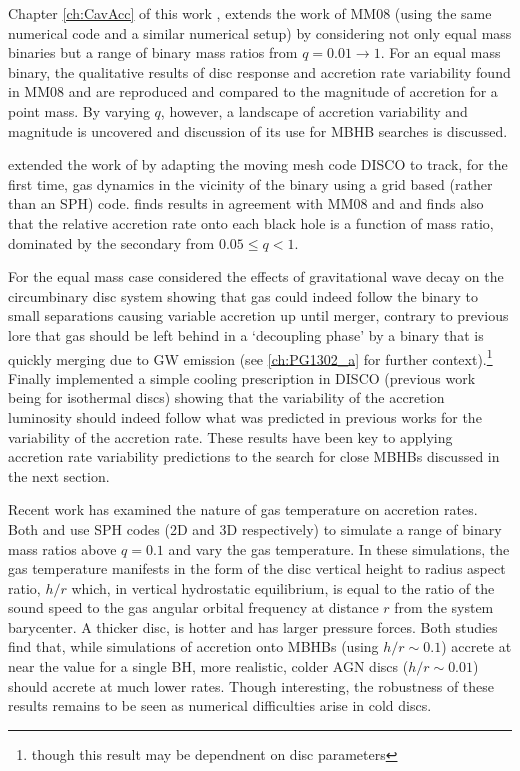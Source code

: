 Chapter \ref{ch:CavAcc} of this work \citep{DHM:2013:MNRAS}, extends the work
of MM08 (using the same numerical code and a similar numerical setup) by
considering not only equal mass binaries but a range of binary mass ratios
from $q=0.01 \rightarrow 1$. For an equal mass binary, the qualitative results
of disc response and accretion rate variability found in MM08 and
\citep{ShiKrolik:2012} are reproduced and compared to the magnitude of
accretion for a point mass. By varying $q$, however, a landscape of accretion
variability and magnitude is uncovered and discussion of its use for MBHB
searches is discussed.

\cite{Farris:2014} extended the work of \cite{DHM:2013:MNRAS} by adapting the
moving mesh code DISCO \citep{Duffell:2011:TESS,
DuffellMHDDISCO:2016} to track, for the first time, gas dynamics in the
vicinity of the binary using a grid based (rather than an SPH)
code. \cite{Farris:2014} finds results in agreement with MM08 and
\cite{DHM:2013:MNRAS} and finds also that the relative accretion rate onto
each black hole is a function of mass ratio, dominated by the secondary from
$0.05 \leq q < 1$. 


For the equal mass case \cite{Farris:2015:GW} considered the effects of
gravitational wave decay on the circumbinary disc system showing that gas
could indeed follow the binary to small separations causing variable accretion
up until merger, contrary to previous lore that gas should be left behind in a
`decoupling phase' by a binary that is quickly merging due to GW emission (see
\ref{ch:PG1302_a} for further context).\footnote{though this result may be
dependnent on disc parameters} Finally \cite{Farris:2015:Cool} implemented a
simple cooling prescription in DISCO (previous work being for isothermal
discs) showing that the variability of the accretion luminosity should indeed
follow what was predicted in previous works for the variability of the
accretion rate. These results have been key to applying accretion rate
variability predictions to the search for close MBHBs discussed in the next
section.



Recent work has examined the nature of gas temperature on accretion rates.
Both \cite{YoungClarke:2015} and \cite{RagusaLodato:2016} use SPH codes (2D
and 3D respectively) to simulate a range of binary mass ratios above $q=0.1$
and vary the gas temperature. In these simulations, the gas temperature
manifests in the form of the disc vertical height to radius aspect ratio,
$h/r$ which, in vertical hydrostatic equilibrium, is equal to the ratio of the
sound speed to the gas angular orbital frequency at distance $r$ from the
system barycenter. A thicker disc, is hotter and has larger pressure forces.
Both studies find that, while simulations of accretion onto MBHBs (using $h/r \sim
0.1$) accrete at near the value for a single BH, more realistic, colder AGN
discs ($h/r \sim 0.01$) should accrete at much lower rates. Though
interesting, the robustness of these results remains to be seen as numerical
difficulties arise in cold discs.%


